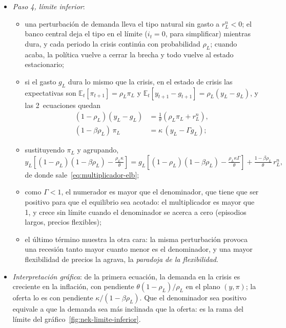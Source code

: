 \documentclass[11pt]{article}
\begin{document}
\begin{itemize}
\item \emph{Paso 4, límite inferior}:
  \begin{itemize}
  \item una perturbación de demanda lleva el tipo natural sin gasto a $r^n_L<0$; el banco central deja el tipo en el límite ($i_t=0$, para simplificar) mientras dura, y cada periodo la crisis continúa con probabilidad $\rho_L$; cuando acaba, la política vuelve a cerrar la brecha y todo vuelve al estado estacionario;
  \item si el gasto $g_L$ dura lo mismo que la crisis, en el estado de crisis las expectativas son $\mathbb{E}_t[\pi_{t+1}]=\rho_L\pi_L$ y $\mathbb{E}_t[y_{t+1}-g_{t+1}]=\rho_L(y_L-g_L)$, y las 2~ecuaciones quedan
    \begin{align*}
    (1-\rho_L)(y_L-g_L)&=\tfrac1\theta\left(\rho_L\pi_L+r^n_L\right),\\
    (1-\beta\rho_L)\,\pi_L&=\kappa\,(y_L-\Gamma g_L);
    \end{align*}
  \item sustituyendo $\pi_L$ y agrupando,
    \begin{equation*}
    y_L\left[(1-\rho_L)(1-\beta\rho_L)-\tfrac{\rho_L\kappa}{\theta}\right]=g_L\left[(1-\rho_L)(1-\beta\rho_L)-\tfrac{\rho_L\kappa\Gamma}{\theta}\right]+\tfrac{1-\beta\rho_L}{\theta}\,r^n_L ,
    \end{equation*}
    de donde sale~\eqref{eq:multiplicador-elb};
  \item como $\Gamma<1$, el numerador es mayor que el denominador, que tiene que ser positivo para que el equilibrio sea acotado: el multiplicador es mayor que 1, y crece sin límite cuando el denominador se acerca a cero (episodios largos, precios flexibles);
  \item el último término muestra la otra cara: la misma perturbación provoca una recesión tanto mayor cuanto menor es el denominador, y una mayor flexibilidad de precios la agrava, la \emph{paradoja de la flexibilidad}\nocite{EggertssonKrugman2012Debt}. \findemo
  \end{itemize}

\item \emph{Interpretación gráfica}: de la primera ecuación, la demanda en la crisis es creciente en la inflación, con pendiente $\theta(1-\rho_L)/\rho_L$ en el plano $(y,\pi)$; la oferta lo es con pendiente $\kappa/(1-\beta\rho_L)$. Que el denominador sea positivo equivale a que la demanda sea más inclinada que la oferta: es la rama del límite del gráfico~\ref{fig:nek-limite-inferior}.


\end{itemize}
\end{document}
